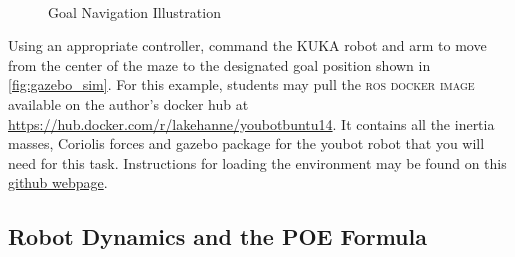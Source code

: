 %
\begin{figure}[tb!]
	\centering
	~ %
	\caption{Goal Navigation Illustration}
	\label{fig:gazebo_sim}
\end{figure}

\begin{homework}
	Using an appropriate controller, command the KUKA robot and arm to move from the center of the maze to the designated goal position shown in \autoref{fig:gazebo_sim}. For this example, students may pull the \textsc{ros docker image} available on the author's docker hub at \href{https://hub.docker.com/r/lakehanne/youbotbuntu14}{https://hub.docker.com/r/lakehanne/youbotbuntu14}. It contains all the inertia masses, Coriolis forces and gazebo package for the youbot robot that you will need for this task. Instructions for loading the environment may be found on this \href{https://github.com/lakehanne/youbot}{github webpage}.
\end{homework}

\subsection{Robot Dynamics and the POE Formula}



